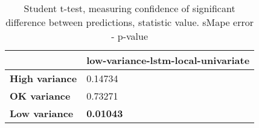 \begin{table}[h]
\centering
\caption{Student t-test, measuring confidence of significant difference between predictions, statistic value. sMape error - p-value}
\label{table:ttest-p-values-variance-experiments-sMAPE}
\begin{tabular}{ll}
\toprule
{} & low-variance-lstm-local-univariate \\
\midrule
\textbf{High variance} &                            0.14734 \\
\textbf{OK variance  } &                            0.73271 \\
\textbf{Low variance } &                   \textbf{0.01043} \\
\bottomrule
\end{tabular}
\end{table}
